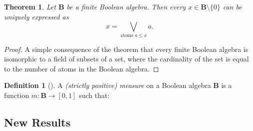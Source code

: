 \documentclass{article}
\newtheorem{theorem}{Theorem}
\theoremstyle{definition}
\newtheorem{definition}{Definition}
\theoremstyle{remark}
\begin{document}
\begin{theorem} \label{thm:representation}
  Let $\mathbf{B}$ be a finite Boolean algebra. Then every $x \in \mathbf{B}
  \setminus \{ 0 \}$ can be uniquely expressed as
  \[
  x = \bigvee_{\text{atoms } a \le x} a.
  \]
\end{theorem}
\begin{proof}
  A simple consequence of the theorem that every finite Boolean algebra is
  isomorphic to a field of subsets of a set, where the cardinality of the set is
  equal to the number of atoms in the Boolean algebra.
\end{proof}

\begin{definition}[\cite{gaifman1964concerning}] \label{def:measure}
  A \emph{(strictly positive) measure} on a Boolean algebra $\mathbf{B}$ is a
  function $m\colon \mathbf{B} \to [0, 1]$ such that:
\end{definition}


\subsection{New Results}
\end{document}
